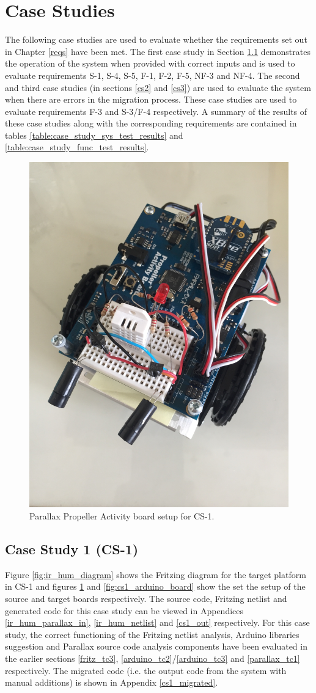 \documentclass{UoYCSproject}
\begin{document}
\section{Case Studies} \label{eval_case_studies}
The following case studies are used to evaluate whether the requirements set out in Chapter \ref{reqs} have been met. The first case study in Section \ref{cs1} demonstrates the operation of the system when provided with correct inputs and is used to evaluate requirements S-1, S-4, S-5, F-1, F-2, F-5, NF-3 and NF-4. The second and third case studies (in sections \ref{cs2} and \ref{cs3}) are used to evaluate the system when there are errors in the migration process. These case studies are used to evaluate requirements F-3 and S-3/F-4 respectively. A summary of the results of these case studies along with the corresponding requirements are contained in tables \ref{table:case_study_sys_test_results} and \ref{table:case_study_func_test_results}.

\begin{figure}[h!]
  \centering
  \includegraphics[width=0.5\linewidth]{graphics/cs1_parallax_board.JPG}
  \caption{Parallax Propeller Activity board setup for CS-1.}
  \label{fig:cs1_parallax_board}
\end{figure}

\subsection{Case Study 1 (CS-1)} \label{cs1}
Figure \ref{fig:ir_hum_diagram} shows the Fritzing diagram for the target platform in CS-1 and figures \ref{fig:cs1_parallax_board} and \ref{fig:cs1_arduino_board} show the set the setup of the source and target boards respectively. The source code, Fritzing netlist and generated code for this case study can be viewed in Appendices \ref{ir_hum_parallax_in}, \ref{ir_hum_netlist} and \ref{cs1_out} respectively. For this case study, the correct functioning of the Fritzing netlist analysis, Arduino libraries suggestion and Parallax source code analysis components have been evaluated in the earlier sections \ref{fritz_tc3}, \ref{arduino_tc2}/\ref{arduino_tc3} and \ref{parallax_tc1} respectively. The migrated code (i.e. the output code from the system with manual additions) is shown in Appendix \ref{cs1_migrated}.
\end{document}
